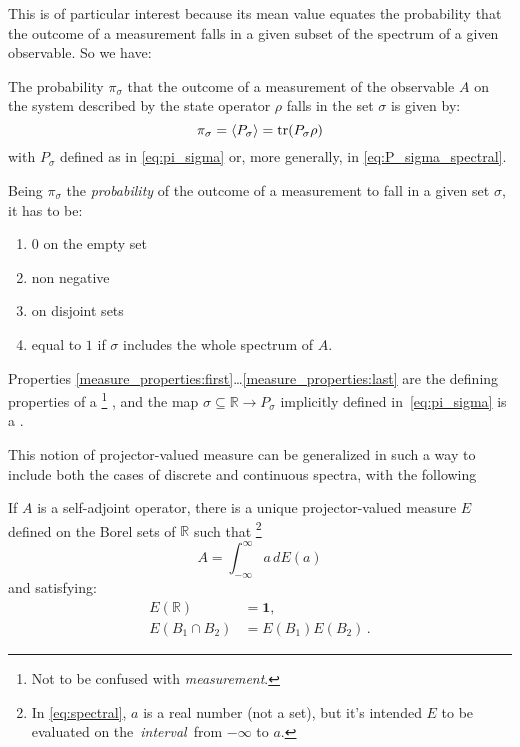 This is of particular interest
because its mean value equates the probability that the outcome of a measurement
falls in a given subset of the spectrum of a given observable.
So we have:

\begin{proposition}\label{probability_rho}
  The probability $\pi_{\sigma}$
  that the outcome of a measurement of the observable $A$
  on the system described by the state operator $\rho$
  falls in the set $\sigma$
  is given by:
  \begin{equation}\label{eq:probability_rho}
    \pi_{\sigma} = \expval{P_{\sigma}} = \tr(P_{\sigma}\rho)
  \end{equation}
  with $P_{\sigma}$ defined as in \eqref{eq:pi_sigma}
  or, more generally, in \eqref{eq:P_sigma_spectral}.
\end{proposition}

Being $\pi_{\sigma}$ the \emph{probability} of the outcome of a measurement to
fall in a given set $\sigma$, it has to be:
\begin{enumerate}
  \item \label{measure_properties:first} $0$ on the empty set
  \item non negative
  \item \label{measure_properties:last}  on disjoint sets
  \item \label{measure_properties:normalized} equal to $1$ if $\sigma$ includes the whole spectrum of $A$.
\end{enumerate}

Properties \ref{measure_properties:first}\dots\ref{measure_properties:last}
are the defining properties of a \footnote{
  Not to be confused with \emph{measurement}.
} \parencite{EncMath_Measure},
and
the map $\sigma \subseteq \mathbb{R} \rightarrow P_{\sigma}$
implicitly defined in~\eqref{eq:pi_sigma} is a .

This notion of projector-valued measure can be generalized
in such a way to include both the cases of discrete and continuous spectra,
with the following \parencite{VonNeumann, Ballentine}
\begin{theorem}
  If $A$ is a self-adjoint operator,
  there is a unique projector-valued measure $E$
  defined on the Borel sets of $\mathbb{R}$
  such that
  \footnote{
    In \eqref{eq:spectral}, $a$ is a real number (not a set),
    but it's intended $E$ to be evaluated
    on the~\emph{interval}~from $-\infty$ to $a$.
  }
  \begin{equation}\label{eq:spectral}
    A=\int_{-\infty}^{\infty}a\, dE(a)
  \end{equation}
  and satisfying:
  \begin{align*}
    E(\mathbb{R})       & =\mathbf{1},\\
    E(B_{1}\cap B_{2}) & =E(B_{1})E(B_{2})\,.
  \end{align*}
\end{theorem}

